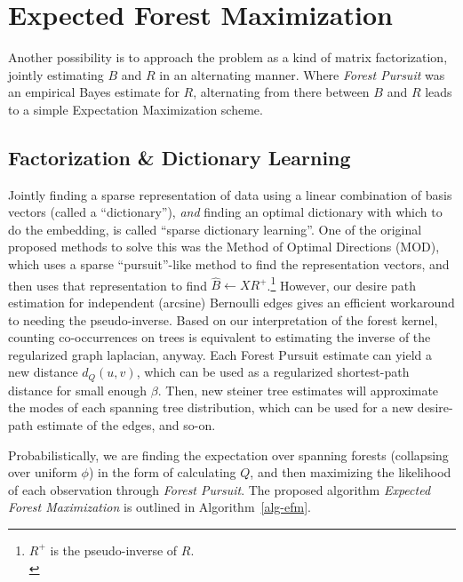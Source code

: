\documentclass[%
	12pt,
		oneside,
		letterpaper
]{book}
\begin{document}
\section{Expected Forest
Maximization}\label{expected-forest-maximization}

Another possibility is to approach the problem as a kind of matrix
factorization, jointly estimating \(B\) and \(R\) in an alternating
manner. Where \emph{Forest Pursuit} was an empirical Bayes estimate for
\(R\), alternating from there between \(B\) and \(R\) leads to a simple
Expectation Maximization scheme.

\subsection{Factorization \& Dictionary
Learning}\label{factorization-dictionary-learning}

Jointly finding a sparse representation of data using a linear
combination of basis vectors (called a ``dictionary''), \emph{and}
finding an optimal dictionary with which to do the embedding, is called
``sparse dictionary learning''. One of the original proposed methods to
solve this was the Method of Optimal Directions
(MOD)\autocite{Methodoptimaldirections_Engan1999}, which uses a sparse
``pursuit''-like method to find the representation vectors, and then
uses that representation to find \(\hat{B}\gets XR^+\).\footnote{
  \(R^+\) is the pseudo-inverse of \(R\).\\
} However, our desire path estimation for independent (arcsine)
Bernoulli edges gives an efficient workaround to needing the
pseudo-inverse. Based on our interpretation of the forest kernel,
counting co-occurrences on trees is equivalent to estimating the inverse
of the regularized graph laplacian, anyway. Each Forest Pursuit estimate
can yield a new distance \(d_Q(u,v)\), which can be used as a
regularized shortest-path distance for small enough \(\beta\). Then, new
steiner tree estimates will approximate the modes of each spanning tree
distribution, which can be used for a new desire-path estimate of the
edges, and so-on.

Probabilistically, we are finding the expectation over spanning forests
(collapsing over uniform \(\phi\)) in the form of calculating \(Q\), and
then maximizing the likelihood of each observation through \emph{Forest
Pursuit}. The proposed algorithm \emph{Expected Forest Maximization} is
outlined in Algorithm~\ref{alg-efm}.
\end{document}
